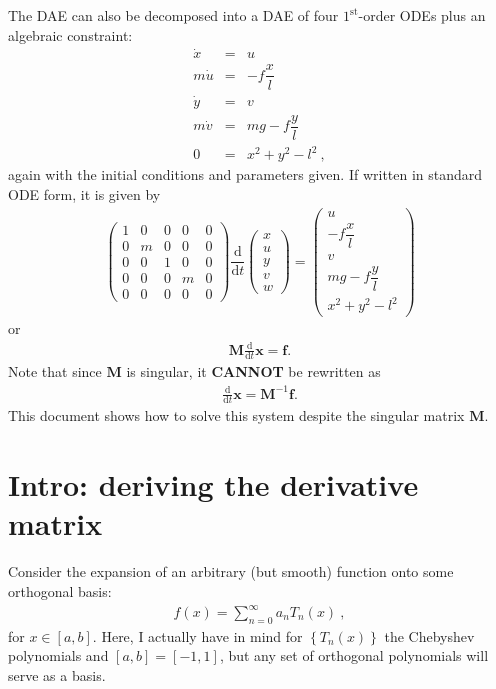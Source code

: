\documentclass[11pt]{amsdtx}
\newcommand{\ud}{\mathrm{d}}
\newcommand{\mbf}[1]{\mathbf{\boldsymbol{#1}}}
\newcommand{\st}{\mathrm{st}}
\begin{document}
The DAE can also be decomposed into a DAE of four $1^{\st}$-order ODEs plus an algebraic constraint:
\begin{eqnarray*}
	\dot{x} &=& u \\
	m\dot{u} &=& - f\dfrac{x}{l} \\
	\dot{y} &=& v  \\
	m \dot{v} &=& mg - f\dfrac{y}{l} \\
	0 &=& x^2 + y^2 - l^2 ~,
\end{eqnarray*}
again with the initial conditions and parameters given.  If written in standard ODE form, it is given by
\begin{eqnarray*}
	\begin{pmatrix}
	1 & 0 & 0 & 0 & 0 \\
	0 & m & 0 & 0 & 0 \\
	0 & 0 & 1 & 0 & 0 \\
	0 & 0 & 0 & m & 0 \\
	0 & 0 & 0 & 0 & 0
	\end{pmatrix} 
	\dfrac{\ud}{\ud t} \begin{pmatrix}
	x \\ u \\ y \\ v \\ w
	\end{pmatrix}
	=
	\begin{pmatrix}
	u \\ -f\dfrac{x}{l} \\ v \\ mg - f\dfrac{y}{l} \\ x^2 + y^2 - l^2
	\end{pmatrix}
\end{eqnarray*}
or
\begin{eqnarray*}
	\mbf{M} \frac{\ud}{\ud t} \mbf{x} = \mbf{f}.
\end{eqnarray*}
Note that since $\mbf{M}$ is singular, it \textbf{CANNOT}  be rewritten as 
\begin{eqnarray*}
	\frac{\ud}{\ud t} \mbf{x} = \mbf{M}^{-1}\mbf{f}.
\end{eqnarray*}
This document shows how to solve this system despite the singular matrix $\mbf{M}$.

\section{Intro: deriving the derivative matrix}

Consider the expansion of an arbitrary (but smooth) function onto some orthogonal basis:
\begin{eqnarray}
	f(x) = \sum_{n = 0}^{\infty} a_n T_n(x)~,
\end{eqnarray}
for $x \in \left[ a, b \right]$.  Here, I actually have in mind for $\left\lbrace T_n(x) \right\rbrace$ the Chebyshev polynomials and $[a, b] = [-1, 1]$, but any set of orthogonal polynomials will serve as a basis.
\end{document}

